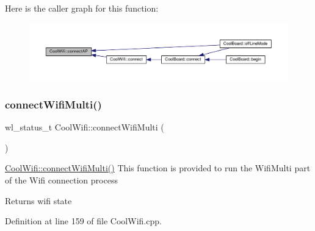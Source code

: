 Here is the caller graph for this function\+:\nopagebreak
\begin{figure}[H]
\begin{center}
\leavevmode
\includegraphics[width=350pt]{d7/d29/class_cool_wifi_a7c857f27161782f5ef1d62d552aff971_icgraph}
\end{center}
\end{figure}
\mbox{\label{class_cool_wifi_a419de92d738f14b7444cf822b3ab0070}} 
\subsubsection{\texorpdfstring{connect\+Wifi\+Multi()}{connectWifiMulti()}}
{\footnotesize\ttfamily wl\+\_\+status\+\_\+t Cool\+Wifi\+::connect\+Wifi\+Multi (\begin{DoxyParamCaption}{ }\end{DoxyParamCaption})}

\hyperlink{class_cool_wifi_a419de92d738f14b7444cf822b3ab0070}{Cool\+Wifi\+::connect\+Wifi\+Multi()} This function is provided to run the Wifi\+Multi part of the Wifi connection process

\begin{DoxyReturn}{Returns}
wifi state 
\end{DoxyReturn}


Definition at line 159 of file Cool\+Wifi.\+cpp.


